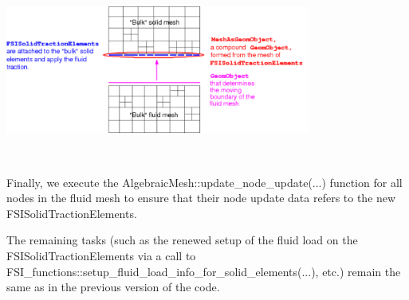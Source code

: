 \begin{DoxyEnumerate}
\begin{DoxyImage}
\includegraphics[width=0.75\textwidth]{fsi_with_adaptive_wall_done}
\end{DoxyImage}
 ~\newline
~\newline

\item Finally, we execute the {\ttfamily Algebraic\+Mesh\+::update\+\_\+node\+\_\+update}(...) function for all nodes in the fluid mesh to ensure that their node update data refers to the new {\ttfamily F\+S\+I\+Solid\+Traction\+Elements}. ~\newline
~\newline

\item The remaining tasks (such as the renewed setup of the fluid load on the {\ttfamily F\+S\+I\+Solid\+Traction\+Elements} via a call to {\ttfamily F\+S\+I\+\_\+functions\+::setup\+\_\+fluid\+\_\+load\+\_\+info\+\_\+for\+\_\+solid\+\_\+elements}(...), etc.) remain the same as in the previous version of the code.
\end{DoxyEnumerate}

 

